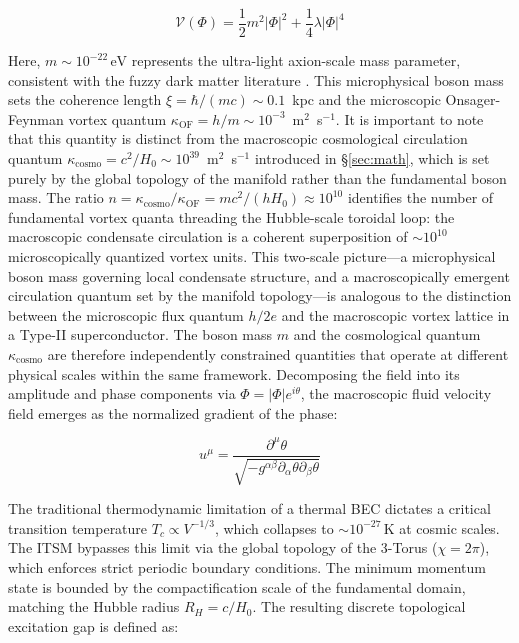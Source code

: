 \documentclass[aps,prd,10pt,onecolumn,superscriptaddress,nofootinbib]{revtex4-2}
\begin{document}
\begin{equation}
\mathcal{V}(\Phi) = \frac{1}{2} m^2 |\Phi|^2 + \frac{1}{4} \lambda |\Phi|^4
\end{equation}

Here, $m \sim 10^{-22}\,\text{eV}$ represents the ultra-light axion-scale mass parameter, consistent with the fuzzy dark matter literature \cite{hui_ultralight}. This microphysical boson mass sets the coherence length $\xi = \hbar/(mc) \sim 0.1$~kpc and the microscopic Onsager-Feynman vortex quantum $\kappa_{\text{OF}} = h/m \sim 10^{-3}$~m$^2$~s$^{-1}$. It is important to note that this quantity is distinct from the macroscopic cosmological circulation quantum $\kappa_{\text{cosmo}} = c^2/H_0 \sim 10^{39}$~m$^2$~s$^{-1}$ introduced in \S\ref{sec:math}, which is set purely by the global topology of the manifold rather than the fundamental boson mass. The ratio $n = \kappa_{\text{cosmo}}/\kappa_{\text{OF}} = mc^2/(hH_0) \approx 10^{10}$ identifies the number of fundamental vortex quanta threading the Hubble-scale toroidal loop: the macroscopic condensate circulation is a coherent superposition of $\sim 10^{10}$ microscopically quantized vortex units. This two-scale picture---a microphysical boson mass governing local condensate structure, and a macroscopically emergent circulation quantum set by the manifold topology---is analogous to the distinction between the microscopic flux quantum $h/2e$ and the macroscopic vortex lattice in a Type-II superconductor. The boson mass $m$ and the cosmological quantum $\kappa_{\text{cosmo}}$ are therefore independently constrained quantities that operate at different physical scales within the same framework. Decomposing the field into its amplitude and phase components via $\Phi = |\Phi|e^{i\theta}$, the macroscopic fluid velocity field emerges as the normalized gradient of the phase:

\begin{equation}
u^\mu = \frac{\partial^\mu \theta}{\sqrt{-g^{\alpha\beta}\partial_\alpha \theta \partial_\beta \theta}}
\end{equation}

The traditional thermodynamic limitation of a thermal BEC dictates a critical transition temperature $T_c \propto V^{-1/3}$, which collapses to $\sim 10^{-27}\,\text{K}$ at cosmic scales. The ITSM bypasses this limit via the global topology of the 3-Torus ($\chi = 2\pi$), which enforces strict periodic boundary conditions. The minimum momentum state is bounded by the compactification scale of the fundamental domain, matching the Hubble radius $R_H = c/H_0$. The resulting discrete topological excitation gap is defined as:
\end{document}
